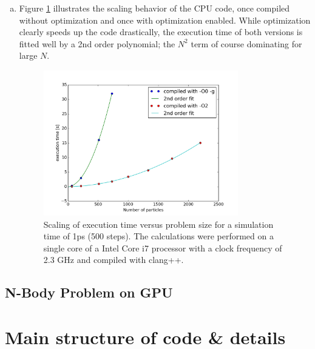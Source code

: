 \documentclass{scrartcl}
\begin{document}
\begin{enumerate}[a)]
    For a problem size of $N=1000$, one integration step takes
    on average 6.86ms (see also Figure \ref{fig:scal}).
    At this problem size, the calculaltion of the forces already 
    dominates strongly, making up 99.5\% of the integration time.
    Obviously, Kernel 2 is the one that ought to be parallelized,
    with a possible speedup of up to 200x for $N=1000$.

\item Figure \ref{fig:scal} illustrates the scaling behavior of the CPU code,
    once compiled without optimization and once with optimization enabled.
    While optimization clearly speeds up the code drastically,
    the execution time of both versions is fitted well by a 2nd order 
    polynomial; the $N^2$ term of course dominating for large $N$.

\begin{figure}[h]
    \centering
    \includegraphics[width=0.80\textwidth]{images/scaling}
    \caption{Scaling of execution time versus problem size for a simulation
             time of 1ps (500 steps). 
             The calculations were performed on a single core of a Intel Core i7 
             processor with a clock frequency of 2.3 GHz and compiled with clang++.}
    \label{fig:scal}
\end{figure}

\end{enumerate}

\subsection{N-Body Problem on GPU}




\section{Main structure of code \& details}
\end{document}
